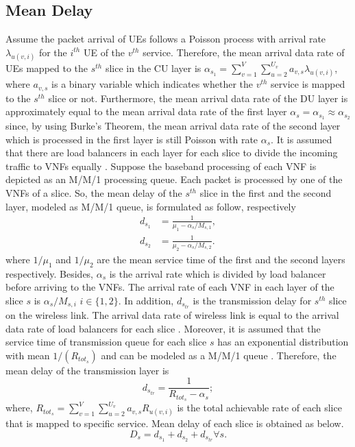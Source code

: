 \documentclass[conference]{IEEEtran}
\begin{document}
\subsection{Mean Delay}
Assume the packet arrival of UEs follows  a Poisson process with arrival rate $\lambda_{u(v,i)}$ for the $i^{th}$ UE of the $v^{th}$ service.
Therefore, the mean arrival data rate of UEs mapped to the $s^{th}$ slice in the CU layer is $\alpha_{s_1} = \sum_{v=1}^{V}\sum_{u=2}^{U_v}a_{v,s}\lambda_{u(v,i)}$, where $a_{v,s}$ is a binary variable which indicates whether the $v^{th}$ service is mapped to the $s^{th}$ slice or not.
Furthermore, the mean arrival data rate of the DU layer is approximately equal to the mean arrival data rate of the first layer $\alpha_{s} =\alpha_{s_1} \approx \alpha_{s_2}$ since, by using Burke’s Theorem, the mean arrival data rate of the second layer which is processed in the first layer is still Poisson with rate $\alpha_{s}$.
It is assumed that there are load balancers in each layer for each slice to divide the incoming traffic to VNFs equally \cite{frdl,luong2018novel,luong2018novel1}.
Suppose the baseband processing of each VNF is depicted as an M/M/1 processing queue.
Each packet is processed by one of the VNFs of a slice. So, the mean delay of the $s^{th}$ slice in the first and the second layer, modeled as M/M/1 queue, is formulated as follow, respectively
\begin{equation}
\begin{split}
d_{s_1} &= \frac{1}{\mu_1 - \alpha_{s}/{M_{s,1}}},\\
d_{s_2} &= \frac{1}{\mu_2 - \alpha_{s}/{M_{s,2}}}.
\end{split}
\end{equation}
where $1/\mu_1$ and $1/\mu_2$ are the mean service time of the first and the second layers respectively.
Besides, $\alpha_{s}$ is the  arrival rate which is divided
by load balancer before arriving to the VNFs. The  arrival rate of each VNF in each layer of the slice $s$ is $\alpha_{s}/{M_{s,i}}$ $ i \in \{1,2\}$.
In addition, $d_{s_{tr}}$ is the transmission delay for $s^{th}$ slice on the  wireless link. The arrival data rate of wireless link
 is equal to the arrival data rate of load balancers for each slice \cite{frdl}.
Moreover, it is assumed that the service time of transmission queue for each slice $s$ has
 an exponential distribution with mean $1/(R_{{tot}_s})$ and can be modeled as a M/M/1 queue \cite{frdl,luong2018novel,luong2018novel1,guo2016exploiting}. Therefore,
the mean delay of the transmission layer is
\begin{equation}
 d_{s_{tr}} = \frac{1}{R_{{tot}_s} - \alpha_{s}};
\end{equation}
where, $R_{{tot}_s} =  \sum_{v=1}^{V}\sum_{u=2}^{U_v}a_{v,s}R_{u(v,i)}$ is the total achievable rate of each slice that is mapped to specific service.
Mean delay of each slice is obtained as below.
\begin{equation}
D_{s} = d_{s_1} + d_{s_2} + d_{s_{tr}} \forall s.
\end{equation}
\end{document}
